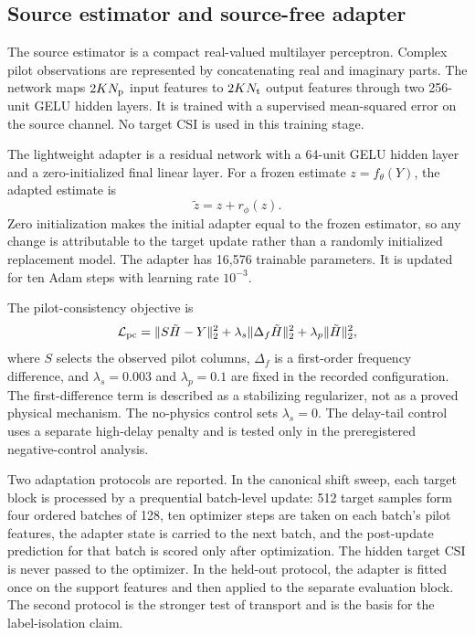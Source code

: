 \documentclass[10pt,twocolumn]{article}
\begin{document}
\subsection{Source estimator and source-free adapter}

The source estimator is a compact real-valued multilayer perceptron. Complex pilot observations are represented by concatenating real and imaginary parts. The network maps $2KN_{\rm p}$ input features to $2KN_{\rm t}$ output features through two 256-unit GELU hidden layers. It is trained with a supervised mean-squared error on the source channel. No target CSI is used in this training stage.

The lightweight adapter is a residual network with a 64-unit GELU hidden layer and a zero-initialized final linear layer. For a frozen estimate $z=f_\theta(Y)$, the adapted estimate is
\begin{equation}
 \tilde z = z + r_\phi(z).
\end{equation}
Zero initialization makes the initial adapter equal to the frozen estimator, so any change is attributable to the target update rather than a randomly initialized replacement model. The adapter has 16,576 trainable parameters. It is updated for ten Adam steps with learning rate $10^{-3}$.

The pilot-consistency objective is
\begin{equation}
 \mathcal L_{\rm pc}=\|S\tilde H-Y\|_2^2+\lambda_s\|\Delta_f\tilde H\|_2^2+\lambda_p\|\tilde H\|_2^2,
\end{equation}
where $S$ selects the observed pilot columns, $\Delta_f$ is a first-order frequency difference, and $\lambda_s=0.003$ and $\lambda_p=0.1$ are fixed in the recorded configuration. The first-difference term is described as a stabilizing regularizer, not as a proved physical mechanism. The no-physics control sets $\lambda_s=0$. The delay-tail control uses a separate high-delay penalty and is tested only in the preregistered negative-control analysis.

Two adaptation protocols are reported. In the canonical shift sweep, each target block is processed by a prequential batch-level update: 512 target samples form four ordered batches of 128, ten optimizer steps are taken on each batch's pilot features, the adapter state is carried to the next batch, and the post-update prediction for that batch is scored only after optimization. The hidden target CSI is never passed to the optimizer. In the held-out protocol, the adapter is fitted once on the support features and then applied to the separate evaluation block. The second protocol is the stronger test of transport and is the basis for the label-isolation claim.
\end{document}
